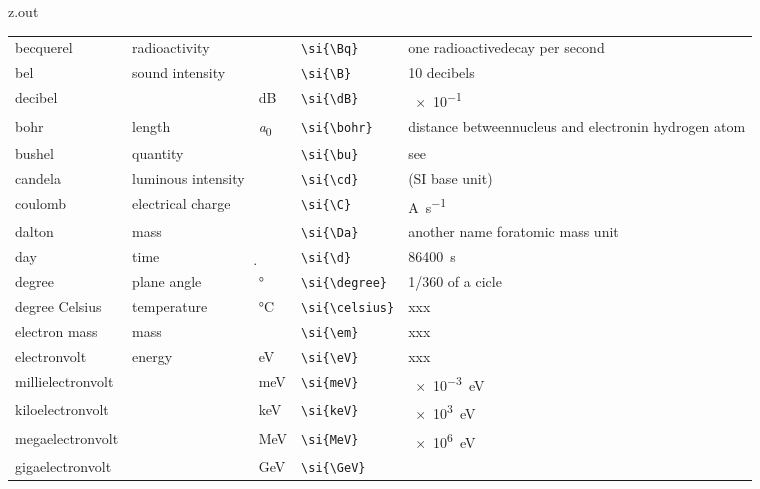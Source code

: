 \begin{VerbatimOut}{z.out}
{\begin{longtable}{@{}P{1.4in}P{1in}llP{1.8in}@{}}
    \vsp
    becquerel&
      radioactivity&
      \si{\Bq}&
      \verb+\si{\Bq}+&
      one radioactive\newline decay per second\\
    \vsp
    bel&
      sound intensity&
      \si{\B}&
      \verb+\si{\B}+&
      10 decibels\\
    \quad decibel&
      \ditto&
      \si{\dB}&
      \verb+\si{\dB}+&
      \SI{e-1}{\B}\\
    \vsp
    bohr&
      length&
      \si{\bohr}&
      \verb+\si{\bohr}+&
      distance between\newline nucleus and electron\newline in hydrogen atom\\
    \vsp
    bushel&
      quantity&
      \si{\bu}&
      \verb+\si{\bu}+&
      see \cite{wikipedia-bushel}\\
    \vsp
    candela&
      luminous intensity&
      \si{\cd}&
      \verb+\si{\cd}+&
      (SI base unit)\\
    \vsp
    coulomb&
      electrical charge&
      \si{\C}&
      \verb+\si{\C}+&
      \si{\A\per\s}\\
    \vsp
    dalton&
      mass&
      \si{\Da}&
      \verb+\si{\Da}+&
      another name for\newline atomic mass unit\\
    \vsp
    day&
      time&
      \si{\d}&
      \verb+\si{\d}+&
      \SI{86400}{\s}\\
    \vsp
    degree&
      plane angle&
      \si{\degree}&
      \verb+\si{\degree}+&
      1/360 of a cicle\\
    \vsp
    degree Celsius&
      temperature&
      \si{\celsius}&
      \verb+\si{\celsius}+&
      xxx\\
    \vsp
    electron mass&
      mass&
      \si{\em}&
      \verb+\si{\em}+&
      xxx\\
    \vsp
    electronvolt&
      energy&
      \si{\eV}&
      \verb+\si{\eV}+&
      xxx\\
    \quad millielectronvolt&
      \ditto&
      \si{\meV}&
      \verb+\si{meV}+&
      \SI{e-3}{\eV}\\
    \quad kiloelectronvolt&
      \ditto&
      \si{\keV}&
      \verb+\si{keV}+&
      \SI{e3}{\eV}\\
    \quad megaelectronvolt&
      \ditto&
      \si{\MeV}&
      \verb+\si{MeV}+&
      \SI{e6}{\eV}\\
    \quad gigaelectronvolt&
      \ditto&
      \si{\GeV}&
      \verb+\si{\GeV}+&

\end{longtable}}
\end{VerbatimOut}
